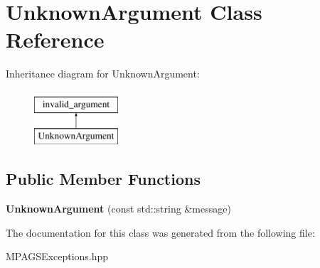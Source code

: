 \hypertarget{class_unknown_argument}{}\section{Unknown\+Argument Class Reference}
\label{class_unknown_argument}
Inheritance diagram for Unknown\+Argument\+:\begin{figure}[H]
\begin{center}
\leavevmode
\includegraphics[height=2.000000cm]{class_unknown_argument}
\end{center}
\end{figure}
\subsection*{Public Member Functions}
\begin{DoxyCompactItemize}
\item 
{\bfseries Unknown\+Argument} (const std\+::string \&message)\hypertarget{class_unknown_argument_a43abeea9d1e4b257b2f8ff6528a5f081}{}\label{class_unknown_argument_a43abeea9d1e4b257b2f8ff6528a5f081}

\end{DoxyCompactItemize}


The documentation for this class was generated from the following file\+:\begin{DoxyCompactItemize}
\item 
M\+P\+A\+G\+S\+Exceptions.\+hpp\end{DoxyCompactItemize}

